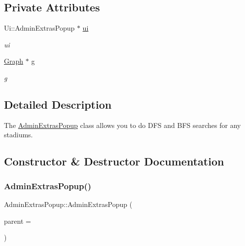 \subsection*{Private Attributes}
\begin{DoxyCompactItemize}
\item 
\mbox{\label{class_admin_extras_popup_ac399036d0968ce3c9032854bdd3031a3}} 
Ui\+::\+Admin\+Extras\+Popup $\ast$ \hyperlink{class_admin_extras_popup_ac399036d0968ce3c9032854bdd3031a3}{ui}
\begin{DoxyCompactList}\small\item\em ui \end{DoxyCompactList}\item 
\mbox{\label{class_admin_extras_popup_a0ee34e447bbc68769a0a6a6430bd4626}} 
\hyperlink{class_graph}{Graph} $\ast$ \hyperlink{class_admin_extras_popup_a0ee34e447bbc68769a0a6a6430bd4626}{g}
\begin{DoxyCompactList}\small\item\em g \end{DoxyCompactList}\end{DoxyCompactItemize}


\subsection{Detailed Description}
The \hyperlink{class_admin_extras_popup}{Admin\+Extras\+Popup} class allows you to do D\+FS and B\+FS searches for any stadiums. 

\subsection{Constructor \& Destructor Documentation}
\mbox{\label{class_admin_extras_popup_aabaeaaf01620c0152932fe79a4753964}} 
\subsubsection{\texorpdfstring{Admin\+Extras\+Popup()}{AdminExtrasPopup()}}
{\footnotesize\ttfamily Admin\+Extras\+Popup\+::\+Admin\+Extras\+Popup (\begin{DoxyParamCaption}\item[{Q\+Widget $\ast$}]{parent = {} }\end{DoxyParamCaption})\hspace{0.3cm}{\ttfamily [explicit]}}



